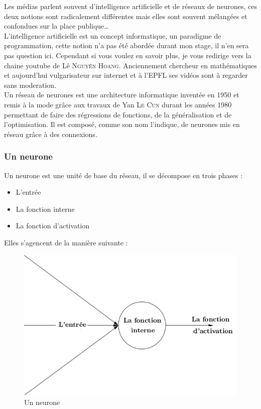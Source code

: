 
Les médias parlent souvent d'intelligence artificielle et de réseaux de neurones,
ces deux notions sont radicalement différentes
mais elles sont souvent mélangées et confondues sur la place publique\ldots \\


L'intelligence artificielle est un concept informatique, un paradigme de programmation,
cette notion n'a pas été abordée durant mon stage, il n'en sera pas question ici.
Cependant si vous voulez en savoir plus, je vous redirige vers la chaine youtube de Lê \textsc{Nguyên Hoang}.
Anciennement chercheur en mathématiques et aujourd'hui vulgarisateur sur internet et à l'\textsc{EPFL}
ses vidéos sont à regarder sans moderation\cite{science4all}. \\


Un réseau de neurones est une architecture informatique inventée en 1950 et remis à la mode grâce aux travaux
de Yan \textsc{Le Cun} durant les années 1980 permettant de faire des régressions de fonctions,
de la généralisation et de l'optimisation.
Il est composé, comme son nom l'indique, de neurones mis en réseau grâce à des connexions.


\subsubsection{Un neurone}
Un neurone est une unité de base du réseau, il se décompose en trois phases :
\begin{itemize}
    \item L'entrée
    \item La fonction interne
    \item La fonction d'activation
\end{itemize}
Elles s'agencent de la manière suivante :
\begin{figure}[H]
    \center
    \includegraphics[height=\petit]{pict/neurone.png}
	\caption{Un neurone}
    \label{fig:neurone}
\end{figure}


